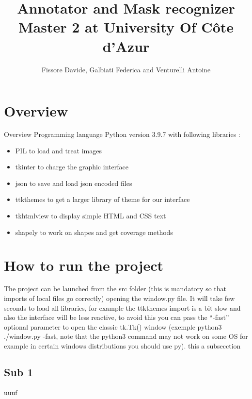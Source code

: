 \documentclass[a4paper, 11pt]{article}
\begin{document}
\title{
  Annotator and Mask recognizer \\
  \large Master 2 at University Of Côte d'Azur
}
\author{Fissore Davide, Galbiati Federica and Venturelli Antoine}
\maketitle
\tableofcontents

\section{Overview}
Overview
Programming language Python version 3.9.7 with following libraries :
\begin{itemize}
  \item PIL to load and treat images
  \item tkinter to charge the graphic interface
  \item json to save and load json encoded files
  \item ttkthemes to get a larger library of theme for our interface
  \item tkhtmlview to display simple HTML and CSS text
  \item shapely to work on shapes and get coverage methods
\end{itemize}
\section{ How to run the project }
The project can be launched from the src folder (this is mandatory so that imports of local
files go correctly) opening the  window.py  file. It  will take few seconds to load all libraries, for
example the ttkthemes import is a bit slow and also the interface will be less reactive, to
avoid this you can pass the  “-fast”  optional parameter  to open the classic tk.Tk() window
(exemple  python3 ./window.py -fast,  note that the  python3 command may not work on
some OS for example in certain windows distributions you should use py).
this a subsecction
\subsection{Sub 1}
uuuf
\end{document}
